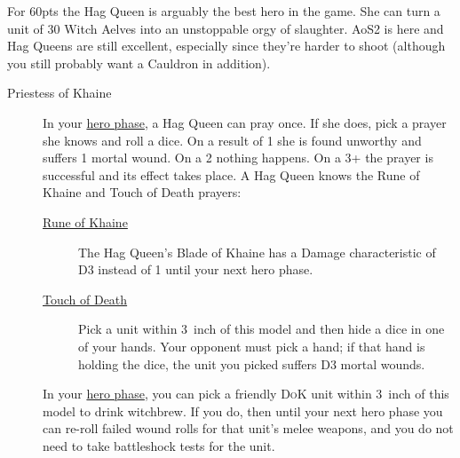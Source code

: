 For 60pts the Hag Queen is arguably
the best hero in the game. She can turn a unit of 30 Witch Aelves into an
unstoppable orgy of slaughter. AoS2 is here and Hag Queens are still
excellent, especially since they're harder to shoot (although you still
probably want a Cauldron in addition).
\begin{description}
    \item [Priestess of Khaine] In your \hyperref[hero-phase]{hero phase},
        a Hag Queen can pray once. If she does, pick a prayer she knows and
        roll a dice. On a result of 1 she is found unworthy and suffers
        1 mortal wound. On a 2 nothing happens. On a 3+ the prayer is
        successful and its effect takes place.  A Hag Queen knows the Rune of
        Khaine and Touch of Death prayers:
        \begin{description}
            \item [{\hyperref[rune-of-khaine]{Rune of Khaine}}] The Hag Queen's
                Blade of Khaine has a Damage characteristic of D3 instead of
                1 until your next hero phase.
            \item [{\hyperref[touch-of-death]{Touch of Death}}] Pick a unit within
                3~inch of this model and then hide a dice in one of your hands.
                Your opponent must pick a hand; if that hand is holding the
                dice, the unit you picked suffers D3 mortal wounds.
        \end{description}
    \item [] In your \hyperref[hero-phase]{hero
        phase}, you can pick a friendly \textsc{DoK} unit within 3~inch of this model to
        drink witchbrew. If you do, then until your next hero phase you can
        re-roll failed wound rolls for that unit's melee weapons, and you do
        not need to take battleshock tests for the unit.
\end{description}


